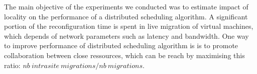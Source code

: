 
%
%
%




The main objective of the experiments we conducted was to estimate
impact of locality on the performance of a distributed scheduling algorithm. 
A significant portion of the reconfiguration time is spent in live migration of
virtual machines, which depends of network parameters such as latency and
bandwidth. One way to improve performance of distributed scheduling algorithm is
is to promote collaboration between close ressources, which can be reach by 
maximising this ratio: $nb\ intrasite\ migrations/nb\ migrations$.


